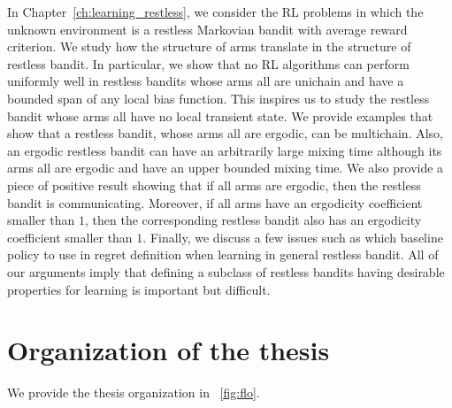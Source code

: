 In Chapter~\ref{ch:learning_restless}, we consider the RL problems in which the unknown environment is a restless Markovian bandit with average reward criterion.
We study how the structure of arms translate in the structure of restless bandit.
In particular, we show that no RL algorithms can perform uniformly well in restless bandits whose arms all are unichain and have a bounded span of any local bias function.
This inspires us to study the restless bandit whose arms all have no local transient state.
We provide examples that show that a restless bandit, whose arms all are ergodic, can be multichain.
Also, an ergodic restless bandit can have an arbitrarily large mixing time although its arms all are ergodic and have an upper bounded mixing time.
We also provide a piece of positive result showing that if all arms are ergodic, then the restless bandit is communicating.
Moreover, if all arms have an ergodicity coefficient smaller than $1$, then the corresponding restless bandit also has an ergodicity coefficient smaller than $1$.
Finally, we discuss a few issues such as which baseline policy to use in regret definition when learning in general restless bandit.
All of our arguments imply that defining a subclass of restless bandits having desirable properties for learning is important but difficult.

\section{Organization of the thesis}

We provide the thesis organization in \figurename~\ref{fig:flo}.


